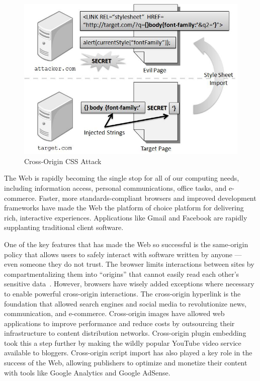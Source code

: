 \documentclass{acm_proc_article-sp}
\begin{document}
\begin{figure}
\centering
\includegraphics[width=\linewidth]{injection.jpg}
\caption{Cross-Origin CSS Attack}
\label{figure:injection}
\end{figure}

The Web is rapidly becoming the single stop for all of our computing needs,
including information access, personal communications, office tasks, and
e-commerce. Faster, more standards-compliant browsers and improved development
frameworks have made the Web the platform of choice platform for delivering
rich, interactive experiences. Applications like Gmail and Facebook are
rapidly supplanting traditional client software.

One of the key features that has made the Web so successful is the same-origin
policy that allows users to safely interact with software written by anyone
--- even someone they do not trust. The browser limits interactions between
sites by compartmentalizing them into ``origins'' that cannot easily read each
other's sensitive data~\cite{mozillasameorigin}. However, browsers have wisely
added exceptions where necessary to enable powerful cross-origin interactions.
The cross-origin hyperlink is the foundation that allowed search engines and
social media to revolutionize news, communication, and e-commerce.
Cross-origin images have allowed web applications to improve performance and
reduce costs by outsourcing their infrastructure to content distribution
networks. Cross-origin plugin embedding took this a step further by making the
wildly popular YouTube video service available to bloggers. Cross-origin
script import has also played a key role in the success of the Web, allowing
publishers to optimize and monetize their content with tools like Google
Analytics and Google AdSense.
\end{document}
